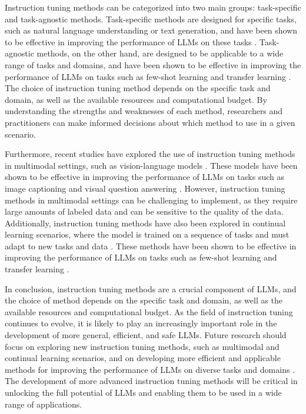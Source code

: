 \documentclass[11pt]{article}
\begin{document}
Instruction tuning methods can be categorized into two main groups: task-specific and task-agnostic methods. Task-specific methods are designed for specific tasks, such as natural language understanding or text generation, and have been shown to be effective in improving the performance of LLMs on these tasks \cite{ref31}. Task-agnostic methods, on the other hand, are designed to be applicable to a wide range of tasks and domains, and have been shown to be effective in improving the performance of LLMs on tasks such as few-shot learning and transfer learning \cite{ref129}. The choice of instruction tuning method depends on the specific task and domain, as well as the available resources and computational budget. By understanding the strengths and weaknesses of each method, researchers and practitioners can make informed decisions about which method to use in a given scenario.

Furthermore, recent studies have explored the use of instruction tuning methods in multimodal settings, such as vision-language models \cite{ref130}. These models have been shown to be effective in improving the performance of LLMs on tasks such as image captioning and visual question answering \cite{ref68}. However, instruction tuning methods in multimodal settings can be challenging to implement, as they require large amounts of labeled data and can be sensitive to the quality of the data. Additionally, instruction tuning methods have also been explored in continual learning scenarios, where the model is trained on a sequence of tasks and must adapt to new tasks and data \cite{ref36}. These methods have been shown to be effective in improving the performance of LLMs on tasks such as few-shot learning and transfer learning \cite{ref131}.

In conclusion, instruction tuning methods are a crucial component of LLMs, and the choice of method depends on the specific task and domain, as well as the available resources and computational budget. As the field of instruction tuning continues to evolve, it is likely to play an increasingly important role in the development of more general, efficient, and safe LLMs. Future research should focus on exploring new instruction tuning methods, such as multimodal and continual learning scenarios, and on developing more efficient and applicable methods for improving the performance of LLMs on diverse tasks and domains \cite{ref32}. The development of more advanced instruction tuning methods will be critical in unlocking the full potential of LLMs and enabling them to be used in a wide range of applications.
\end{document}
